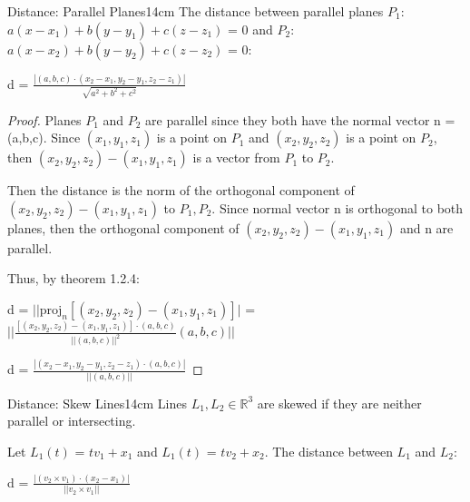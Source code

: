     \vspace{0.5cm}



    \begin{wtheorem}{Distance: Parallel Planes}{14cm}
        The distance between parallel planes
        $P_1$: $a(x-x_1) + b(y-y_1) + c(z-z_1)$ = 0
        and $P_2$: $a(x-x_2) + b(y-y_2) + c(z-z_2)$ = 0:

        \hspace{0.5cm}
        d = $\frac{|(a,b,c) \cdot (x_2-x_1,y_2-y_1,z_2-z_1)|}{\sqrt{a^2+b^2+c^2}}$
    \end{wtheorem}

    \begin{proof}
        Planes $P_1$ and $P_2$ are parallel since they both have the normal vector
        n = (a,b,c).
        Since $(x_1,y_1,z_1)$ is a point on $P_1$ and
        $(x_2,y_2,z_2)$ is a point on $P_2$, then
        $(x_2,y_2,z_2) - (x_1,y_1,z_1)$ is a vector from $P_1$ to $P_2$.

        Then the distance is the norm of the orthogonal component of
        $(x_2,y_2,z_2) - (x_1,y_1,z_1)$ to $P_1,P_2$.
        Since normal vector n is orthogonal to both planes, then
        the orthogonal component of $(x_2,y_2,z_2) - (x_1,y_1,z_1)$
        and n are parallel.
        
        Thus, by {\color{red} theorem 1.2.4}:

        \hspace{0.5cm}
        d = $||\text{proj}_n[(x_2,y_2,z_2) - (x_1,y_1,z_1)]|$
        = $||\frac{[(x_2,y_2,z_2) - (x_1,y_1,z_1)] \cdot (a,b,c)}
                    {||(a,b,c)||^2}(a,b,c)||$

        \hspace{0.5cm}
        d = $\frac{|(x_2-x_1,y_2-y_1,z_2-z_1) \cdot (a,b,c)|}
        {||(a,b,c)||}$
    \end{proof}

    \vspace{0.5cm}



    \begin{wtheorem}{Distance: Skew Lines}{14cm}
        Lines $L_1,L_2 \in \mathbb{R}^3$ are skewed if they are neither parallel
        or intersecting.

        Let $L_1(t)$ = $tv_1 + x_1$ and $L_1(t)$ = $tv_2 + x_2$.
        The distance between $L_1$ and $L_2$:

        \hspace{0.5cm}
        d = $\frac{| (v_2 \times v_1) \cdot (x_2-x_1) |}{||v_2 \times v_1||}$
    \end{wtheorem}

